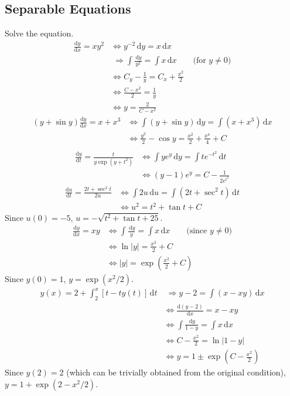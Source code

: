 \documentclass[a4paper,12pt]{article}
\newcommand{\ud}{\,\mathrm{d}}
\newcommand{\leibniz}[3][]{\frac{\mathrm{d} #1 #2}{\mathrm{d} #3 #1}}
\begin{document}
\subsection{Separable Equations}
Solve the equation.
\begin{align*}
  \leibniz{y}{x} = xy^2
  &\iff y^{-2}\ud y = x\ud x\\
  &\;\Longrightarrow \int\frac{\ud y}{y^2} = \int x\ud x
  \qquad\text{(for $y\neq 0$)}\\
  &\iff C_y - \frac{1}{y} = C_x + \frac{x^2}{2}\\
  &\iff \frac{C - x^2}{2} = \frac{1}{y}\\
  &\iff y = \frac{2}{C - x^2}\tag{1}
\end{align*}
\begin{align*}
  (y + \sin y)\leibniz{y}{x} = x + x^3
  &\iff \int(y + \sin y)\ud y = \int(x + x^3)\ud x\\
  &\iff \frac{y^2}{2} - \cos y = \frac{x^2}{2} + \frac{x^4}{4} + C\tag{5}\\
\end{align*}
\begin{align*}
  \leibniz{y}{t} = \frac{t}{y\exp(y + t^2)}
  &\iff \int ye^y\ud y = \int te^{-t^2}\ud t\\
  &\iff (y - 1)e^y = C - \frac{1}{2e^{t^2}}\tag{7}
\end{align*}
\begin{align*}
  \leibniz{u}{t} = \frac{2t + \sec^2 t}{2u}
  &\iff \int 2u\ud u = \int(2t + \sec^2 t)\ud t\\
  &\iff u^2 = t^2 + \tan t + C\tag{13}
\end{align*}
Since $u(0) = -5$, $u = -\sqrt{t^2 + \tan t + 25}$.
\begin{align*}
  \leibniz{y}{x} = xy
  &\iff \int\frac{\ud y}{y} = \int x\ud x\qquad\text{(since $y\neq 0$)}\\
  &\iff \ln|y| = \frac{x^2}{2} + C\\
  &\iff |y| = \exp\left(\frac{x^2}{2} + C\right)\tag{19}
\end{align*}
Since $y(0) = 1$, $y = \exp(x^2/2)$.\pagebreak
\begin{align*}
  y(x) = 2 + \int_2^x[t - ty(t)]\ud t
  &\;\Longrightarrow y - 2 = \int(x - xy)\ud x\\
  &\iff \leibniz{(y - 2)}{x} = x - xy\\
  &\iff \int\frac{\ud y}{1 - y} = \int x\ud x\\
  &\iff C - \frac{x^2}{2} = \ln|1 - y|\\
  &\iff y = 1 \pm \exp\left(C - \frac{x^2}{2}\right)\tag{33}
\end{align*}
Since $y(2) = 2$ (which can be trivially obtained from the original condition),
$y = 1 + \exp(2 - x^2/2)$.
\end{document}
